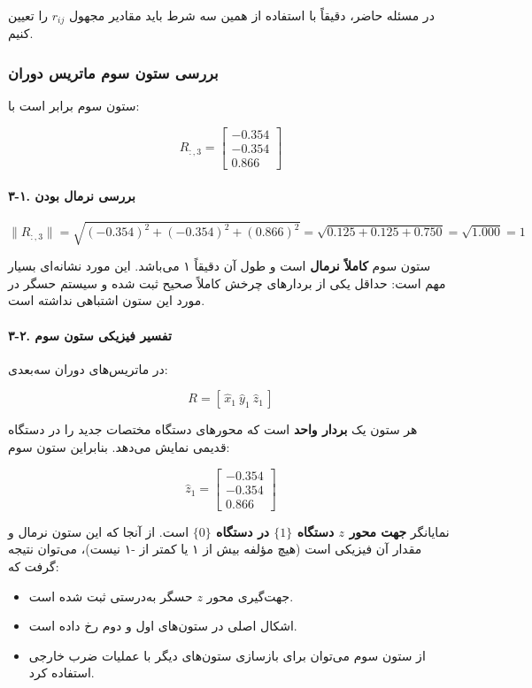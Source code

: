 \documentclass{article}
\begin{document}
در مسئله حاضر، دقیقاً با استفاده از همین سه شرط باید مقادیر مجهول $r_{ij}$ را تعیین کنیم.

\subsubsection{بررسی ستون سوم ماتریس دوران}

ستون سوم برابر است با:

\[
R_{:,3} =
\begin{bmatrix}
	-0.354 \\
	-0.354 \\
	0.866
\end{bmatrix}
\]

\paragraph*{۳-۱. بررسی نرمال بودن}

\[
\|R_{:,3}\| =
\sqrt{(-0.354)^2 + (-0.354)^2 + (0.866)^2}
= \sqrt{0.125 + 0.125 + 0.750}
= \sqrt{1.000}
= 1
\]

ستون سوم \textbf{کاملاً نرمال} است و طول آن دقیقاً ۱ می‌باشد. این مورد نشانه‌ای بسیار مهم است:  
حداقل یکی از بردارهای چرخش کاملاً صحیح ثبت شده و سیستم حسگر در مورد این ستون اشتباهی نداشته است.

\paragraph*{۳-۲. تفسیر فیزیکی ستون سوم}

در ماتریس‌های دوران سه‌بعدی:

\[
R = [\, \hat{x}_1 \ \hat{y}_1 \ \hat{z}_1 \,]
\]

هر ستون یک \textbf{بردار واحد} است که محورهای دستگاه مختصات جدید را در دستگاه قدیمی نمایش می‌دهد. بنابراین ستون سوم:

\[
\hat{z}_1 =
\begin{bmatrix}
	-0.354 \\
	-0.354 \\
	0.866
\end{bmatrix}
\]

نمایانگر \textbf{جهت محور $z$ دستگاه $\{1\}$ در دستگاه $\{0\}$} است.  
از آنجا که این ستون نرمال و مقدار آن فیزیکی است (هیچ مؤلفه بیش از ۱ یا کمتر از -۱ نیست)، می‌توان نتیجه گرفت که:

\begin{itemize}
	\item جهت‌گیری محور $z$ حسگر به‌درستی ثبت شده است.
	\item اشکال اصلی در ستون‌های اول و دوم رخ داده است.
	\item از ستون سوم می‌توان برای بازسازی ستون‌های دیگر با عملیات ضرب خارجی استفاده کرد.
\end{itemize}
\end{document}
